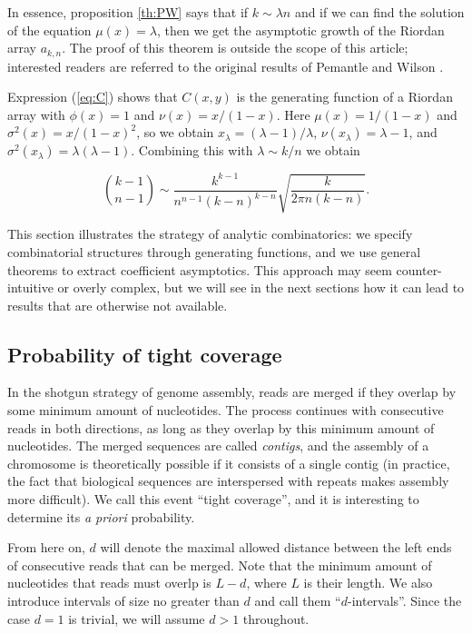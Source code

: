 \documentclass{article}
\begin{document}
In essence, proposition \ref{th:PW} says that if $k \sim \lambda n$ and if
we can find the solution of the equation $\mu(x) = \lambda$, then we get
the asymptotic growth of the Riordan array $a_{k,n}$. The proof of this
theorem is outside the scope of this article; interested readers are
referred to the original results of Pemantle and Wilson
\cite{PemWil02,AnalComb2013}.

Expression (\ref{eq:C}) shows that $C(x,y)$ is the generating function of
a Riordan array with $\phi(x) = 1$ and $\nu(x) = x/(1-x)$.  Here $\mu(x) =
1/(1-x)$ and $\sigma^2(x) = x/(1-x)^2$, so we obtain $x_\lambda = (\lambda
-1)/\lambda$, $\nu(x_\lambda) = \lambda -1$, and $\sigma^2(x_\lambda) =
\lambda(\lambda-1)$. Combining this with $\lambda \sim k/n$ we obtain

\begin{equation}
\label{eq:assBC}
{k-1 \choose n-1} \sim \frac{k^{k-1}}{n^{n-1}(k-n)^{k-n}}
\sqrt{\frac{k}{2\pi n(k-n)}}.
\end{equation}

This section illustrates the strategy of analytic combinatorics: we
specify combinatorial structures through generating functions, and we use
general theorems to extract coefficient asymptotics. This approach may
seem counter-intuitive or overly complex, but we will see in the next
sections how it can lead to results that are otherwise not available. 

\subsection{Probability of tight coverage}
\label{sec:compass}

In the shotgun strategy of genome assembly, reads are merged if they
overlap by some minimum amount of nucleotides. The process continues with
consecutive reads in both directions, as long as they overlap by this
minimum amount of nucleotides. The merged sequences are called
\emph{contigs}, and the assembly of a chromosome is theoretically possible
if it consists of a single contig (in practice, the fact that biological
sequences are interspersed with repeats makes assembly more difficult). We
call this event ``tight coverage'', and it is interesting to determine
its \textit{a priori} probability.

From here on, $d$ will denote the maximal allowed distance between the
left ends of consecutive reads that can be merged. Note that the minimum
amount of nucleotides that reads must overlp is $L-d$, where $L$ is their
length. We also introduce intervals of size no greater than $d$ and call
them ``$d$-intervals''. Since the case $d=1$ is trivial, we will assume $d
> 1$ throughout.
\end{document}
